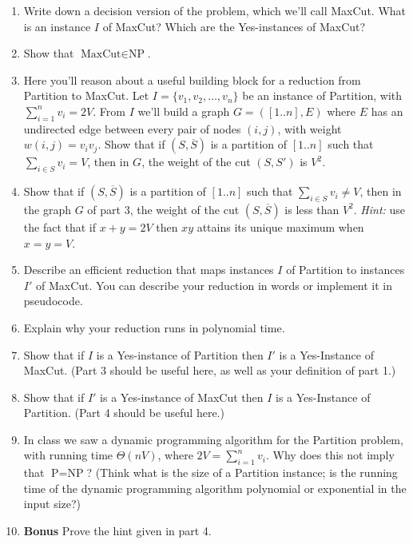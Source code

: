 \documentclass[11pt]{article}
\def\question#1{\red{#1}}
\def\red#1{{\color{red}#1}}
\begin{document}
\begin{enumerate}
\item \question{Write down a decision version of the problem, which
we'll call MaxCut. What is an instance $I$ of MaxCut? Which are the
Yes-instances of MaxCut?}

\item \question{Show that $\text{MaxCut} \in \text{NP}$.}

\item Here you'll reason about a useful building block for a reduction
from Partition to MaxCut.
Let $I = \{v_1,v_2,\ldots,v_n\}$ be an instance of Partition, with
$\sum_{i=1}^n v_i = 2V$.  From $I$ we'll build a graph $G =
   ([1..n], E)$ where $E$ has an undirected edge between every pair of
nodes $(i,j)$, with weight $w(i,j) = v_i v_j$.
\question{Show that if $(S, \overline{S})$ is a partition of $[1..n]$ such that
$\sum_{i\in S} v_i = V$, then in $G$, the weight of the cut $(S,S')$
is $V^2$.}

\item \question{Show that if $(S, \overline{S})$ is a partition of $[1..n]$ such that
$\sum_{i\in S} v_i \neq V$, then in the graph $G$ of part 3, the weight of the cut $(S,\overline{S})$
is less than $V^2$.}
\emph{Hint:} use the fact that if $x + y = 2V$ then $x y$ attains its unique maximum
when $x = y = V$.

\item \question{Describe an efficient reduction that maps instances $I$ of Partition to instances $I'$ 
of MaxCut.}
You can describe your reduction in words or implement it in pseudocode.

\item \question{Explain why your reduction runs in polynomial time.}

\item \question{Show that if $I$ is a Yes-instance of Partition then $I'$ is a
Yes-Instance of MaxCut.} (Part 3 should be useful here, as well as
your definition of part 1.)

\item \question{Show that if $I'$ is a Yes-instance of MaxCut then $I$ is a Yes-Instance of Partition.}
(Part 4 should be useful here.)

\item In class we saw a dynamic programming algorithm for the Partition
problem, with running time $\Theta(nV)$, where $2V = \sum_{i=1}^n v_i$.
\question{Why does this not imply that $\text{P}=\text{NP}$?} (Think what is
the size of a Partition instance; is the running time of the dynamic
programming algorithm polynomial or exponential in the input size?)

\item \textbf{Bonus} \question{Prove the hint given in part 4.}
\end{enumerate}
\end{document}
